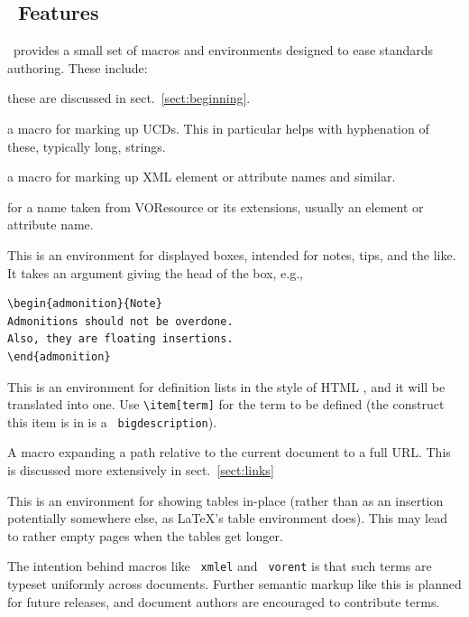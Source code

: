 \documentclass[11pt,a4paper]{ivoa}
\newcommand{\texword}[1]{\texttt{\color{texcolor} #1}}
\begin{document}
\subsection{\ivoatex\ Features}

\ivoatex\ provides a small set of macros and environments designed
to ease standards authoring.  These include:

\begin{bigdescription}
\item[\texword{author}, \texword{previousversion}, \texword{ivoagroup}] these are discussed
in sect.~\ref{sect:beginning}.
\item[\texword{ucd}] a macro for marking up UCDs.  This in particular
helps with hyphenation of these, typically long, strings.
\item[\texword{xmlel}] a macro for marking up XML element or attribute
names and similar.
\item[\texword{vorent}] for a name taken from VOResource or its
extensions, usually an
element or attribute name.
\item[\texword{admonition}] This is an environment for
displayed boxes, intended for notes, tips, and the like.
It takes an argument giving the head of the box, e.g.,

\begin{lstlisting}
\begin{admonition}{Note}
Admonitions should not be overdone.
Also, they are floating insertions.
\end{admonition}
\end{lstlisting}
\item[\texword{bigdescription}] This is an environment for definition
lists in the style of HTML , and it will be translated into
one.  Use \verb|\item[term]| for the term to be defined
(the construct this item is in is a \texword{bigdescription}).
\item[\texword{auxilaryurl}] A macro expanding a path relative to the
current document to a full URL.  This is discussed more extensively in
sect.~\ref{sect:links}
\item[\texword{inlinetable}] This is an environment for showing tables
in-place (rather than as an insertion potentially somewhere else, as
LaTeX's table environment does).  This may lead to rather empty pages
when the tables get longer.
\end{bigdescription}

The intention behind macros like \texword{xmlel} and \texword{vorent} is
that such terms are typeset uniformly across documents.  Further
semantic markup like this is planned for future releases, and document
authors are encouraged to contribute terms.
\end{document}
